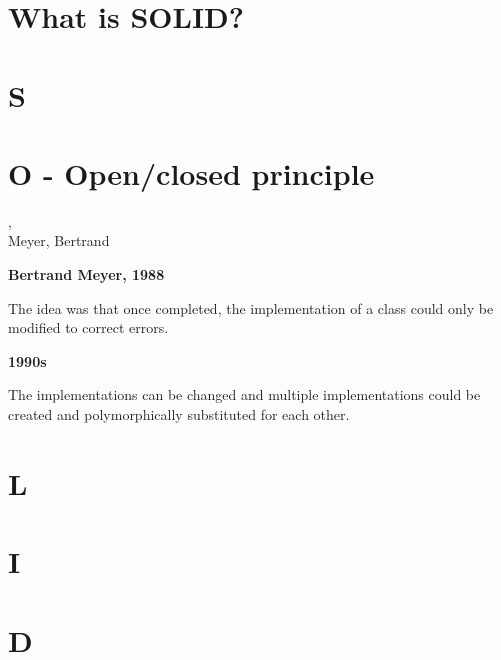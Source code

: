 \section{What is SOLID?} %
\label{sec:what_is_solid_}


\section{S} %
\label{sec:s}


\section{O - Open/closed principle} %
\label{sec:o}

\begin{frame}
	, \\Meyer, Bertrand 
\end{frame}

\begin{frame}
	

\begin{Parallel}[v]{5cm}{5cm}
    \ParallelLText%
    {
    	\textbf{Bertrand Meyer, 1988}
    			
    	The idea was that once completed, the implementation of a class could only be modified to correct errors.
    }
    \ParallelRText%
    {
    	\textbf{1990s}
    	
    	The implementations can be changed and multiple implementations could be created and polymorphically substituted for each other.
	}
\end{Parallel}

\end{frame}


\section{L} %
\label{sec:l}


\section{I} %
\label{sec:i}


\section{D} %
\label{sec:d}

